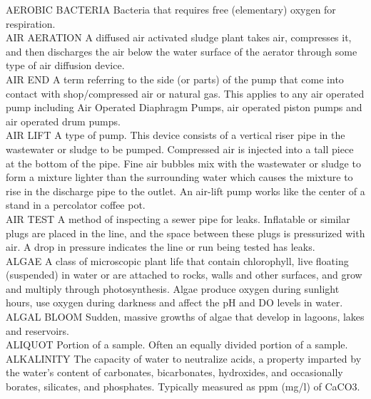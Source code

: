 \documentclass{article}
\begin{document}
AEROBIC BACTERIA
Bacteria that requires free (elementary) oxygen for respiration.
\vspace{0.3cm}\\
AIR AERATION
A diffused air activated sludge plant takes air, compresses it, and then discharges the air below the water surface of the aerator through some type of air diffusion device.
\vspace{0.3cm}\\
AIR END
A term referring to the side (or parts) of the pump that come into contact with shop/compressed air or natural gas. This applies to any air operated pump including Air Operated Diaphragm Pumps, air operated piston pumps and air operated drum pumps.
\vspace{0.3cm}\\
AIR LIFT
A type of pump. This device consists of a vertical riser pipe in the wastewater or sludge to be pumped. Compressed air is injected into a tall piece at the bottom of the pipe.   Fine air bubbles mix with the wastewater or sludge to form a mixture lighter than the surrounding water which causes the mixture to rise in the discharge pipe to the outlet. An air-lift pump works like the center of a stand in a percolator coffee pot.
\vspace{0.3cm}\\
AIR TEST
A method of inspecting a sewer pipe for leaks. Inflatable or similar plugs are placed in the line, and the space between these plugs is pressurized with air. A drop in pressure indicates the line or run being tested has leaks. 
\vspace{0.3cm}\\
ALGAE
A class of microscopic plant life that contain chlorophyll, live floating (suspended) in water or are attached to rocks, walls and other surfaces, and grow and multiply through photosynthesis. Algae produce oxygen during sunlight hours, use oxygen during darkness and affect the pH and DO levels in water.
\vspace{0.3cm}\\
ALGAL BLOOM
Sudden, massive growths of algae that develop in lagoons, lakes and reservoirs.
\vspace{0.3cm}\\
ALIQUOT
Portion of a sample. Often an equally divided portion of a sample.
\vspace{0.3cm}\\
ALKALINITY
The capacity of water to neutralize acids, a property imparted by the water’s content of carbonates, bicarbonates, hydroxides, and occasionally borates, silicates, and phosphates.  Typically measured as ppm (mg/l) of CaCO3.
\end{document}
